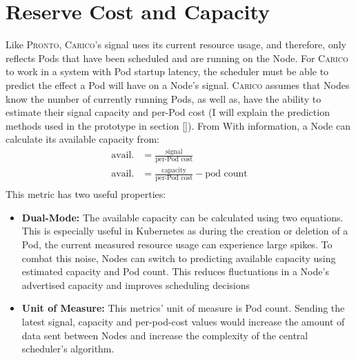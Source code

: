 \section{Reserve Cost and Capacity}
\label{sec:spazio-cost-capacity}
Like \textsc{Pronto}, \textsc{Carico}'s signal uses its current resource usage, and therefore, only
reflects Pods that have been scheduled and are running on the Node. For \textsc{Carico}
to work in a system with Pod startup latency, the scheduler must be able to
predict the effect a Pod will have on a Node's signal. \textsc{Carico} assumes that Nodes
know the number of currently running Pods, as well as, have the ability to
estimate their signal capacity and per-Pod cost (I will explain the prediction
methods used in the prototype in section \ref{}). From With information, a Node
can calculate its available capacity from:
\begin{align}
    \text{avail.} &= \frac{\text{signal}}{\text{per-Pod cost}} \\
    \text{avail.} &= \frac{\text{capacity}}{\text{per-Pod cost}} - \text{pod
    count}\\
\end{align}
This metric has two useful properties:
\begin{itemize}
    \item \textbf{Dual-Mode:} The available capacity can be calculated
        using two equations. This is especially useful in Kubernetes as during
        the creation or deletion of a Pod, the current measured resource usage
        can experience large spikes. To combat this noise, Nodes can switch to
        predicting available capacity using estimated capacity and Pod count.
        This reduces fluctuations in a Node's advertised capacity and improves
        scheduling decisions
    \item \textbf{Unit of Measure:} This metrics' unit of measure is Pod count.
        Sending the latest signal, capacity and per-pod-cost values would
        increase the amount of data sent between Nodes and increase the
        complexity of the central scheduler's algorithm.
\end{itemize}


